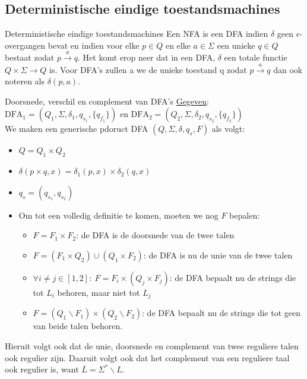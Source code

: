 \newpage

\subsection{Deterministische eindige toestandsmachines}

\vspace{0.5cm}

\begin{theo}{Deterministische eindige toestandsmachines}
    Een NFA is een DFA indien \(\delta\) geen \(\epsilon\)-overgangen bevat en 
    indien voor elke \(p \in Q\) en elke \(a \in \Sigma\) een unieke \(q \in Q\) 
    bestaat zodat \(p \overset{a}{\to} q\). Het komt erop neer dat in een DFA, \(\delta\) 
    een totale functie $Q \times \Sigma \to Q$ is. Voor DFA's zullen a
    we de unieke toestand q zodat \(p \overset{a}{\to} q\) dan ook noteren als \(\delta(p,a)\).
\end{theo}

\begin{pro}{Doorsnede, verschil en complement van DFA's}
    \underline{Gegeven}: ${\text{DFA}}_1 = (Q_1,\Sigma, \delta_1, q_{s_1}, \{q_{f_1}\})$ en ${\text{DFA}}_2 = (Q_2,\Sigma, \delta_2, q_{s_2}, \{q_{f_2}\})$ \\

    We maken een generische pdoruct DFA $(Q,\Sigma, \delta, q_s, F)$ als volgt:
    \begin{itemize}
        \item $Q = Q_1 \times Q_2$
        \item $\delta(p \times q, x) = \delta_1(p,x) \times \delta_2(q,x)$
        \item $q_s = (q_{s_1},q_{s_2})$
        \item 
            Om tot een volledig definitie te komen, moeten we nog $F$ bepalen:
            \begin{itemize}
                \item $F = F_1 \times F_2$: de DFA is de doorsnede van de twee talen
                \item $F = (F_1 \times Q_2) \cup (Q_1 \times F_2)$: de DFA is nu de unie van de twee talen
                \item $\forall i \neq j \in [1,2]: \ F =  F_i \times (Q_j \times F_j)$: de DFA bepaalt nu de strings die tot $L_i$ behoren, maar niet tot $L_j$
                \item $F = (Q_1 \backslash F_1) \times (Q_2 \backslash F_2)$: de DFA bepaalt nu de strings die tot geen van beide talen behoren.
            \end{itemize}
    \end{itemize}
    Hieruit volgt ook dat de unie, doorsnede en complement van twee reguliere talen ook regulier zijn. Daaruit volgt ook dat het
    complement van een reguliere taal ook regulier is, want $\overline{L} = \Sigma^* \backslash L$.
\end{pro}

